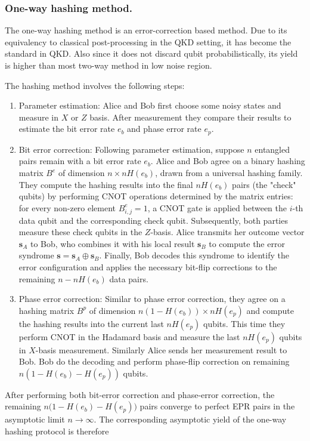 \documentclass[onecolumn,prx,longbibliography,nofootinbib, superscriptaddress]{revtex4-2}
\theoremstyle{recap}
\begin{document}
\subsubsection{One-way hashing method.}
The one-way hashing method is an error-correction based method. Due to its equivalency to classical post-processing in the QKD setting, it has become the standard in QKD. Also since it does not discard qubit probabilistically, its yield is higher than most two-way method in low noise region. 

The hashing method involves the following steps:
\begin{enumerate}
    \item Parameter estimation: Alice and Bob first choose some noisy states and measure in $X$ or $Z$ basis. After measurement they compare their results to estimate the bit error rate $e_b$ and phase error rate $e_p$. 
    \item Bit error correction: Following parameter estimation, suppose $n$ entangled pairs remain with a bit error rate $e_b$. Alice and Bob agree on a binary hashing matrix $B^{e}$ of dimension $n \times nH(e_b)$, drawn from a universal hashing family. They compute the hashing results into the final $nH(e_b)$ pairs (the "check" qubits) by performing CNOT operations determined by the matrix entries: for every non-zero element $B^{e}_{i,j}=1$, a CNOT gate is applied between the $i$-th data qubit and the corresponding check qubit.  Subsequently, both parties measure these check qubits in the $Z$-basis. Alice transmits her outcome vector $\mathbf{s}_A$ to Bob, who combines it with his local result $\mathbf{s}_B$ to compute the error syndrome $\mathbf{s} = \mathbf{s}_A \oplus \mathbf{s}_B$. Finally, Bob decodes this syndrome to identify the error configuration and applies the necessary bit-flip corrections to the remaining $n-nH(e_b)$ data pairs.
    \item Phase error correction: Similar to phase error correction, they agree on a hashing matrix $B^p$ of dimension $n(1-H(e_b))\times nH(e_p)$ and compute the hashing results into the current last $nH(e_p)$ qubits. This time they perform CNOT in the Hadamard basis and measure the last $nH(e_p)$ qubits in $X$-basis measurement. Similarly Alice sends her measurement result to Bob. Bob do the decoding and perform phase-flip correction on remaining $n(1-H(e_b)-H(e_p))$ qubits.  
\end{enumerate}
After performing both bit-error correction and phase-error correction, the remaining
$n\bigl(1 - H(e_b) - H(e_p)\bigr)$ pairs converge to perfect EPR pairs in the asymptotic limit $n \to \infty$. The corresponding asymptotic yield of the one-way hashing protocol is therefore 
\end{document}
